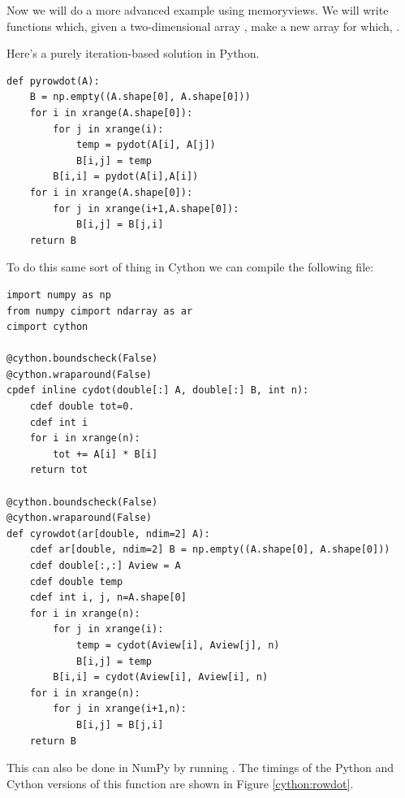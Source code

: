 Now we will do a more advanced example using memoryviews.
We will write functions which, given a two-dimensional array , make a new array  for which, .

Here's a purely iteration-based solution in Python.
\begin{lstlisting}
def pyrowdot(A):
    B = np.empty((A.shape[0], A.shape[0]))
    for i in xrange(A.shape[0]):
        for j in xrange(i):
            temp = pydot(A[i], A[j])
            B[i,j] = temp
        B[i,i] = pydot(A[i],A[i])
    for i in xrange(A.shape[0]):
        for j in xrange(i+1,A.shape[0]):
            B[i,j] = B[j,i]
    return B
\end{lstlisting}

To do this same sort of thing in Cython we can compile the following file:

\begin{lstlisting}
import numpy as np
from numpy cimport ndarray as ar
cimport cython

@cython.boundscheck(False)
@cython.wraparound(False)
cpdef inline cydot(double[:] A, double[:] B, int n):
    cdef double tot=0.
    cdef int i
    for i in xrange(n):
        tot += A[i] * B[i]
    return tot

@cython.boundscheck(False)
@cython.wraparound(False)
def cyrowdot(ar[double, ndim=2] A):
    cdef ar[double, ndim=2] B = np.empty((A.shape[0], A.shape[0]))
    cdef double[:,:] Aview = A
    cdef double temp
    cdef int i, j, n=A.shape[0]
    for i in xrange(n):
        for j in xrange(i):
            temp = cydot(Aview[i], Aview[j], n)
            B[i,j] = temp
        B[i,i] = cydot(Aview[i], Aview[i], n)
    for i in xrange(n):
        for j in xrange(i+1,n):
            B[i,j] = B[j,i]
    return B
\end{lstlisting}

This can also be done in NumPy by running .
The timings of the Python and Cython versions of this function are shown in Figure \ref{cython:rowdot}.

